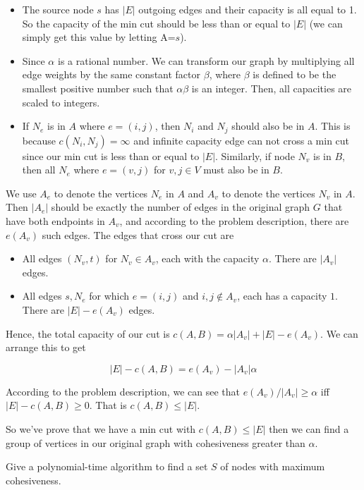 \begin{itemize}
\item The source node $s$ has $|E|$ outgoing edges and their capacity is all equal to 1. So the capacity of the min cut should be less than or equal to $|E|$ (we can simply get this value by letting A=$s$).
\item Since $\alpha$ is a rational number. We can transform our graph by multiplying all edge weights by the same constant factor $\beta$, where $\beta$ is defined to be the smallest positive number such that $\alpha \beta$ is an integer. Then, all capacities are scaled to integers.
\item If $N_e$ is in $A$ where $e=(i, j)$, then $N_i$ and $N_j$ should also be in $A$. This is because $c(N_i, N_j) = \infty$ and infinite capacity edge can not cross a min cut since our min cut is less than or equal to $|E|$. Similarly, if node $N_v$ is in $B$, then all $N_e$ where $e=(v, j)$ for $v ,j\in V$ must also be in $B$.
\end{itemize}

We use $A_e$ to denote the vertices $N_e$ in $A$ and $A_v$ to denote the vertices $N_v$ in $A$. Then $|A_e|$ should be exactly the number of edges in the original graph $G$ that have both endpoints in $A_v$, and according to the problem description, there are $e(A_v)$ such edges. The edges that cross our cut are 

\begin{itemize}
\item All edges $(N_v, t)$ for $N_v \in A_v$, each with the capacity $\alpha$. There are $|A_v|$ edges.
\item All edges $s, N_e$ for which $e=(i,j)$ and $i,j \notin A_v$, each has a capacity $1$. There are $|E|-e(A_v)$ edges.
\end{itemize}

Hence, the total capacity of our cut is $c(A,B)=\alpha |A_v|+|E|-e(A_v)$. We can arrange this to get

\[ |E|-c(A,B) = e(A_v) - |A_v|\alpha \]

According to the problem description, we can see that $e(A_v)/|A_v| \ge \alpha$ iff $|E|-c(A,B)\ge 0$. That is $c(A,B)\le |E|$.

So we've prove that we have a min cut with $c(A,B) \le |E|$ then we can find a group of vertices in our original graph with cohesiveness greater than $\alpha$.


Give a polynomial-time algorithm to find a set $S$ of nodes with maximum cohesiveness.

